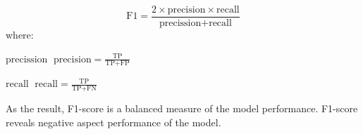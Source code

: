\begin{equation}
\label{eq:f1}
\text{F1} = \frac{2 \times \text{precision} \times \text{recall} }{\text{precission} + \text{recall}}
\end{equation}
where: 
\begin{eqexpl}[25mm]
	\item{$\text{precission}$} $\; \text{precision} = \frac{\text{TP}}{\text{TP} + \text{FP}} \;$
	\item{$\text{recall}$} $\; \text{recall} = \frac{\text{TP}}{\text{TP} + \text{FN}} \;$ 
\end{eqexpl}

As the result, F1-score is a balanced measure of the model performance. F1-score reveals negative aspect performance of the model.

